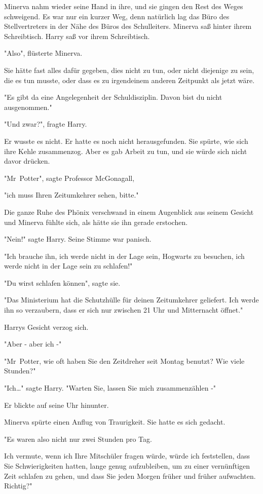 {Minerva nahm wieder seine Hand in ihre, und sie gingen den Rest des Weges schweigend. Es war nur ein kurzer Weg, denn natürlich lag das Büro des Stellvertreters in der Nähe des Büros des Schulleiters. Minerva saß hinter ihrem Schreibtisch. Harry saß vor ihrem Schreibtisch.

"Also", flüsterte Minerva.

Sie hätte fast alles dafür gegeben, dies nicht zu tun, oder nicht diejenige zu sein, die es tun musste, oder dass es zu irgendeinem anderen Zeitpunkt als jetzt wäre.

"Es gibt da eine Angelegenheit der Schuldisziplin. Davon bist du nicht ausgenommen."

"Und zwar?", fragte Harry.

Er wusste es nicht. Er hatte es noch nicht herausgefunden. Sie spürte, wie sich ihre Kehle zusammenzog. Aber es gab Arbeit zu tun, und sie würde sich nicht davor drücken.

"Mr~Potter", sagte Professor McGonagall,

"ich muss Ihren Zeitumkehrer sehen, bitte."

Die ganze Ruhe des Phönix verschwand in einem Augenblick aus seinem Gesicht und Minerva fühlte sich, als hätte sie ihn gerade erstochen.

"Nein!" sagte Harry. Seine Stimme war panisch.

"Ich brauche ihn, ich werde nicht in der Lage sein, Hogwarts zu besuchen, ich werde nicht in der Lage sein zu schlafen!"

"Du wirst schlafen können", sagte sie.

"Das Ministerium hat die Schutzhülle für deinen Zeitumkehrer geliefert. Ich werde ihn so verzaubern, dass er sich nur zwischen 21 Uhr und Mitternacht öffnet."

Harrys Gesicht verzog sich.

"Aber - aber ich -"

"Mr~Potter, wie oft haben Sie den Zeitdreher seit Montag benutzt? Wie viele Stunden?"

"Ich…" sagte Harry. "Warten Sie, lassen Sie mich zusammenzählen -"

Er blickte auf seine Uhr hinunter.

Minerva spürte einen Anflug von Traurigkeit. Sie hatte es sich gedacht.

"Es waren also nicht nur zwei Stunden pro Tag.

Ich vermute, wenn ich Ihre Mitschüler fragen würde, würde ich feststellen, dass Sie Schwierigkeiten hatten, lange genug aufzubleiben, um zu einer vernünftigen Zeit schlafen zu gehen, und dass Sie jeden Morgen früher und früher aufwachten. Richtig?"

}
